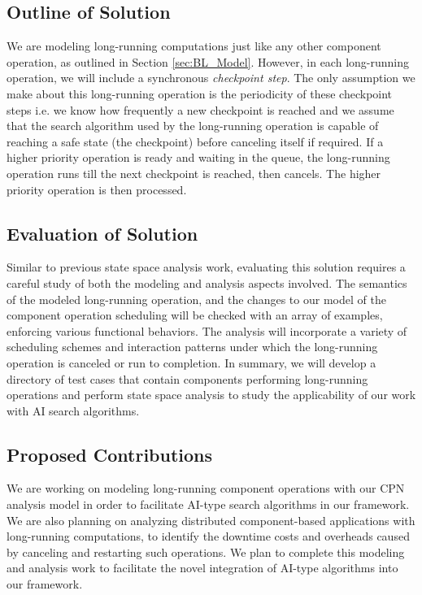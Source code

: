 \subsection{Outline of Solution}
We are modeling long-running computations just like any other component operation, as outlined in Section \ref{sec:BL_Model}. However, in each long-running operation, we will include a synchronous \emph{checkpoint step}. The only assumption we make about this long-running operation is the periodicity of these checkpoint steps i.e. we know how frequently a new checkpoint is reached and we assume that the search algorithm used by the long-running operation is capable of reaching a safe state (the checkpoint) before canceling itself if required. If a higher priority operation is ready and waiting in the queue, the long-running operation runs till the next checkpoint is reached, then cancels. The higher priority operation is then processed.  

\subsection{Evaluation of Solution}
Similar to previous state space analysis work, evaluating this solution requires a careful study of both the modeling and analysis aspects involved. The semantics of the modeled long-running operation, and the changes to our model of the component operation scheduling will be checked with an array of examples, enforcing various functional behaviors. The analysis will incorporate a variety of scheduling schemes and interaction patterns under which the long-running operation is canceled or run to completion. In summary, we will develop a directory of test cases that contain components performing long-running operations and perform state space analysis to study the applicability of our work with AI search algorithms.

\subsection{Proposed Contributions}
We are working on modeling long-running component operations with our CPN analysis model in order to facilitate AI-type search algorithms in our framework. We are also planning on analyzing distributed component-based applications with long-running computations, to identify the downtime costs and overheads caused by canceling and restarting such operations. We plan to complete this modeling and analysis work to facilitate the novel integration of AI-type algorithms into our framework.

